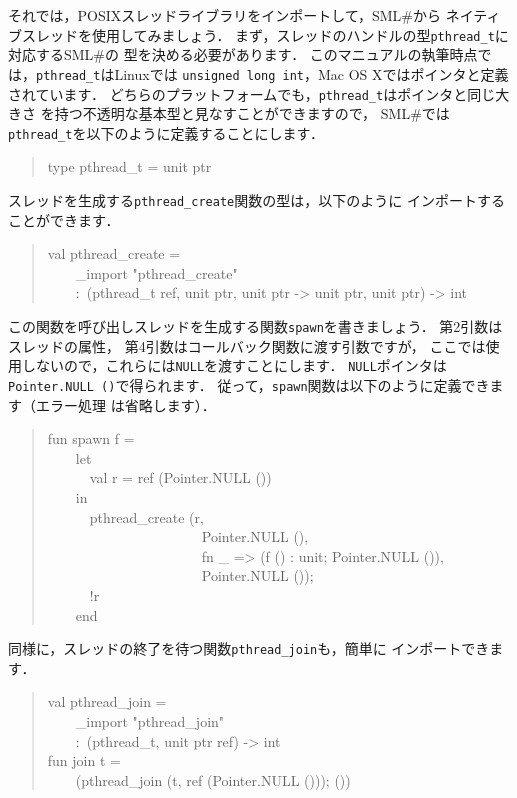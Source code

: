 \documentclass{jbook}
\newcommand{\smlsharp}{SML\#}
\newenvironment{program}{\begin{quote}\begin{tt}}%
                        {\end{tt}\end{quote}}
\begin{document}
	それでは，POSIXスレッドライブラリをインポートして，\smlsharp{}から
ネイティブスレッドを使用してみましょう．
	まず，スレッドのハンドルの型{\tt pthread\_t}に対応する\smlsharp{}の
型を決める必要があります．
	このマニュアルの執筆時点では，{\tt pthread\_t}はLinuxでは
{\tt unsigned long int}，Mac OS Xではポインタと定義されています．
	どちらのプラットフォームでも，{\tt pthread\_t}はポインタと同じ大きさ
を持つ不透明な基本型と見なすことができますので，
\smlsharp{}では{\tt pthread\_t}を以下のように定義することにします．
\begin{program}
type pthread\_t = unit ptr
\end{program}
	スレッドを生成する{\tt pthread\_create}関数の型は，以下のように
インポートすることができます．
\begin{program}
val pthread\_create =\\
\ \ \ \ \_import "pthread\_create"\\
\ \ \ \ :\ (pthread\_t ref, unit ptr, unit ptr -> unit ptr, unit ptr) -> int
\end{program}
	この関数を呼び出しスレッドを生成する関数{\tt spawn}を書きましょう．
	第2引数はスレッドの属性，
第4引数はコールバック関数に渡す引数ですが，
ここでは使用しないので，これらには{\tt NULL}を渡すことにします．
	{\tt NULL}ポインタは{\tt Pointer.NULL ()}で得られます．
	従って，{\tt spawn}関数は以下のように定義できます（エラー処理
は省略します）．
\begin{program}
fun spawn f =\\
\ \ \ \ let\\
\ \ \ \ \ \ val r = ref (Pointer.NULL ())\\
\ \ \ \ in\\
\ \ \ \ \ \ pthread\_create (r,\\
\ \ \ \ \ \ \ \ \ \ \ \ \ \ \ \ \ \ \ \ \ \ Pointer.NULL (),\\
\ \ \ \ \ \ \ \ \ \ \ \ \ \ \ \ \ \ \ \ \ \ fn \_ => (f () : unit; Pointer.NULL ()),\\
\ \ \ \ \ \ \ \ \ \ \ \ \ \ \ \ \ \ \ \ \ \ Pointer.NULL ());\\
\ \ \ \ \ \ !r\\
\ \ \ \ end
\end{program}
	同様に，スレッドの終了を待つ関数{\tt pthread\_join}も，簡単に
インポートできます．
\begin{program}
val pthread\_join =\\
\ \ \ \ \_import "pthread\_join"\\
\ \ \ \ :\ (pthread\_t, unit ptr ref) -> int\\
fun join t =\\
\ \ \ \ (pthread\_join (t, ref (Pointer.NULL ())); ())
\end{program}
\end{document}

